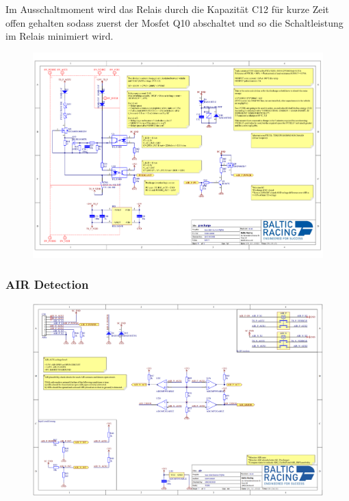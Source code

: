 Im Ausschaltmoment wird das Relais durch die Kapazität C12 für kurze Zeit offen gehalten sodass zuerst der Mosfet Q10 abschaltet und so die Schaltleistung im Relais minimiert wird.

\begin{figure}
	\centering
	\includegraphics[width=0.7\linewidth]{bilder/Precharge_Complete}
	\caption{}
	\label{fig:prechargecomplete}
\end{figure}

\subsubsection{AIR Detection}

\begin{figure}
	\centering
	\includegraphics[width=0.7\linewidth]{bilder/AIR_conditioning}
	\caption{}
	\label{fig:airconditioning}
\end{figure}

